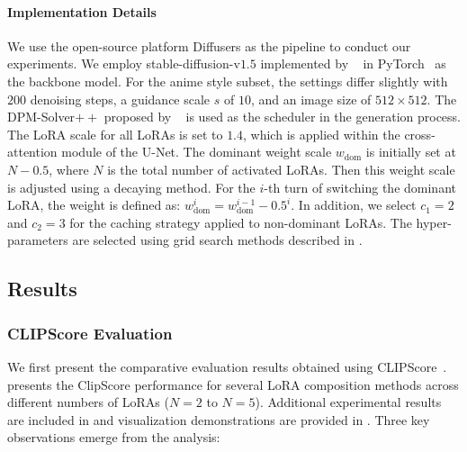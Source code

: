 \paragraph{Implementation Details}
We use the open-source platform Diffusers \citep{diffusers} as the pipeline to conduct our experiments. We employ stable-diffusion-v$1.5$ implemented by ~\citet{sd1.5} in PyTorch~\citep{pytorch} as the backbone model. For the anime style subset, the settings differ slightly with $200$ denoising steps, a guidance scale $s$ of $10$, and an image size of $512\times512$. The DPM-Solver$++$ proposed by ~\citet{dpmsolver} is used as the scheduler in the generation process. The LoRA scale for all LoRAs is set to $1.4$, which is applied within the cross-attention module of the U-Net. The dominant weight scale $w_{\text{dom}}$ is initially set at $N-0.5$, where $N$ is the total number of activated LoRAs. Then this weight scale is adjusted using a decaying method. For the $i$-th turn of switching the dominant LoRA, the weight is defined as: $w^{i}_{\text{dom}}=w^{i-1}_{\text{dom}}-0.5^{i}$. In addition, we select $c_{1}=2$ and $c_{2}=3$ for the caching strategy applied to non-dominant LoRAs. The hyper-parameters are selected using grid search methods described in .
\vspace{-5pt}
\subsection{Results}
\label{sec:results}
\vspace{-2pt}
\subsubsection{CLIPScore Evaluation}
\begin{table}[H]
\setlength{\abovecaptionskip}{0pt}
\setlength{\belowcaptionskip}{-7pt}
    \centering
    
\end{table}
\vspace{-18pt}
We first present the comparative evaluation results obtained using CLIPScore~\citep{clipscore}.  presents the ClipScore performance for several LoRA composition methods across different numbers of LoRAs ($N=2$ to $N=5$). Additional experimental results are included in  and visualization demonstrations are provided in . Three key observations emerge from the analysis:

